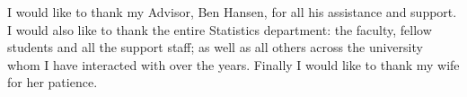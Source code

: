 I would like to thank my Advisor, Ben Hansen, for all his assistance and support. I would also like to thank the entire Statistics department: the
faculty, fellow students and all the support staff; as well as all others across the university whom I have interacted with over the years. Finally I
would like to thank my wife for her patience.